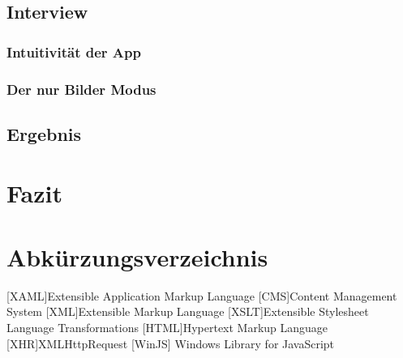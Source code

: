\documentclass[12pt,a4paper]{scrartcl}
\begin{document}
\subsection{Interview}
\label{subsec:interview}

\subsubsection{Intuitivität der App} 
\label{subsubsec:intuitivitätderapp}

\subsubsection{Der nur Bilder Modus}
\label{subsubsec:nurbildermodus}

\subsection{Ergebnis}
\label{subsec:ergebnis}

\newpage
\section{Fazit}
\label{sec:fazit}

\newpage
\section*{Abkürzungsverzeichnis}
\label{sec:abkürzungen}
\begin{acronym}[SEPSEP]
	[XAML]{Extensible Application Markup Language}
	 [CMS]{Content Management System}
	 [XML]{Extensible Markup Language}
	[XSLT]{Extensible Stylesheet Language Transformations}
	[HTML]{Hypertext Markup Language}
	[XHR]{XMLHttpRequest}
	[WinJS] {Windows Library for JavaScript}
\end{acronym}

\newpage
\begin{singlespace}
	
	
\end{singlespace}

\newpage
\listoffigures
\end{document}
